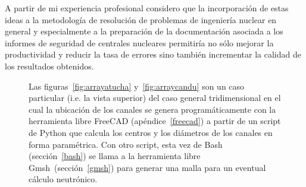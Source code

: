 A partir de mi experiencia profesional considero que la incorporación de estas ideas a la metodología de resolución de problemas de ingeniería nuclear en general y especialmente a la preparación de la documentación asociada a los informes de seguridad de centrales nucleares permitiría no sólo mejorar la productividad y reducir la tasa de errores sino también incrementar la calidad de los resultados obtenidos.

\begin{figure}[t!]
\begin{center}
 \hspace{0.2cm}

 \hspace{0.2cm}
\end{center}
\caption{\label{fig:array3d}Las figuras~\ref{fig:arrayatucha} y~\ref{fig:arraycandu} son un caso particular (i.e. la vista superior) del caso general tridimensional en el cual la ubicación de los canales se genera programáticamente con la herramienta libre FreeCAD (apéndice~\ref{freecad}) a partir de un script de Python que calcula los centros y los diámetros de los canales en forma paramétrica. Con otro script, esta vez de Bash (sección~\ref{bash}) se llama a la herramienta libre Gmsh~(sección~\ref{gmsh}) para generar una malla para un eventual cálculo neutrónico.}
\end{figure}

\medskip

